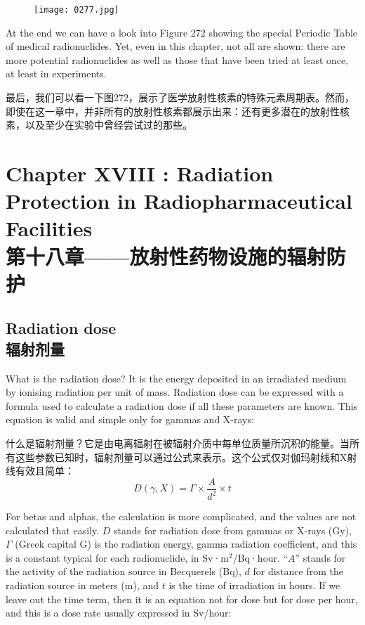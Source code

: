 \documentclass[dvipsnames, svgnames,a4paper,11pt]{article}
\begin{document}
\begin{figure}[h]
	\centering
    \texttt{[image: 0277.jpg]}  
     \label{fig372}
\end{figure}

At the end we can have a look into Figure 272 showing the special Periodic Table of medical radionuclides. Yet, even in this chapter, not all are shown: there are more potential radionuclides as well as those that have been tried at least once, at least in experiments.

最后，我们可以看一下图272，展示了医学放射性核素的特殊元素周期表。然而，即使在这一章中，并非所有的放射性核素都展示出来：还有更多潜在的放射性核素，以及至少在实验中曾经尝试过的那些。


\newpage


\section{Chapter XVIII :   Radiation Protection in Radiopharmaceutical Facilities\\第十八章——放射性药物设施的辐射防护}
\subsection{Radiation dose \\ 辐射剂量}  
What is the radiation dose? It is the energy deposited in an irradiated medium by ionising radiation per unit of mass. Radiation dose can be expressed with a formula used to calculate a radiation dose if all these parameters are known. This equation is valid and simple only for gammas and X-rays:

什么是辐射剂量？它是由电离辐射在被辐射介质中每单位质量所沉积的能量。当所有这些参数已知时，辐射剂量可以通过公式来表示。这个公式仅对伽玛射线和X射线有效且简单：
\[
D(\gamma, X) = \Gamma \times \frac{A}{d^{2}} \times t
\]

For betas and alphas, the calculation is more complicated, and the values are not calculated that easily. \(D\) stands for radiation dose from gammas or X-rays (Gy), \(\Gamma\) (Greek capital G) is the radiation energy, gamma radiation coefficient, and this is a constant typical for each radionuclide, in Sv·m\(^2\)/Bq·hour. “\(A\)” stands for the activity of the radiation source in Becquerels (Bq), \(d\) for distance from the radiation source in meters (m), and \(t\) is the time of irradiation in hours. If we leave out the time term, then it is an equation not for dose but for dose per hour, and this is a dose rate usually expressed in Sv/hour:
\end{document}
